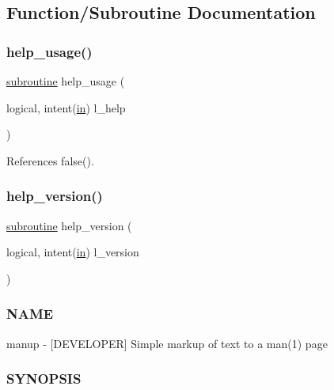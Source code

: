 \subsection{Function/\+Subroutine Documentation}
\mbox{\label{manup_8f90_a3e09a3b52ee8fb04eeb93fe5761626a8}} 
\subsubsection{\texorpdfstring{help\+\_\+usage()}{help\_usage()}}
{\footnotesize\ttfamily \hyperlink{M__stopwatch_83_8txt_acfbcff50169d691ff02d4a123ed70482}{subroutine} help\+\_\+usage (\begin{DoxyParamCaption}\item[{logical, intent(\hyperlink{M__journal_83_8txt_afce72651d1eed785a2132bee863b2f38}{in})}]{l\+\_\+help }\end{DoxyParamCaption})}



References false().

\mbox{\label{manup_8f90_a39c21619b08a3c22f19e2306efd7f766}} 
\subsubsection{\texorpdfstring{help\+\_\+version()}{help\_version()}}
{\footnotesize\ttfamily \hyperlink{M__stopwatch_83_8txt_acfbcff50169d691ff02d4a123ed70482}{subroutine} help\+\_\+version (\begin{DoxyParamCaption}\item[{logical, intent(\hyperlink{M__journal_83_8txt_afce72651d1eed785a2132bee863b2f38}{in})}]{l\+\_\+version }\end{DoxyParamCaption})}



\subsubsection*{N\+A\+ME}

manup -\/ \mbox{[}D\+E\+V\+E\+L\+O\+P\+ER\mbox{]} Simple markup of text to a man(1) page 

\subsubsection*{S\+Y\+N\+O\+P\+S\+IS}

